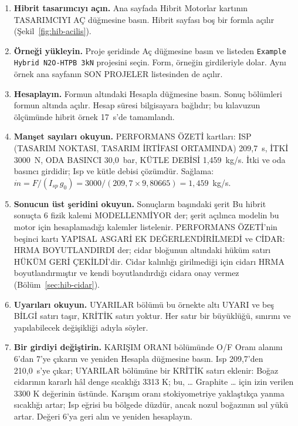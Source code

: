 \documentclass[11pt,a4paper]{article}
\newcommand{\ui}[1]{\textsf{#1}}
\newcommand{\kod}[1]{\texttt{#1}}
\begin{document}
\begin{enumerate}[leftmargin=1.6em]
  \item \textbf{Hibrit tasarımcıyı açın.} Ana sayfada \ui{Hibrit Motorlar}
  kartının \ui{TASARIMCIYI AÇ} düğmesine basın. Hibrit sayfası boş bir formla
  açılır (Şekil~\ref{fig:hib-acilis}).

  \item \textbf{Örneği yükleyin.} Proje şeridinde \ui{Aç} düğmesine basın ve
  listeden \kod{Example Hybrid N2O-HTPB 3kN} projesini seçin. Form, örneğin
  girdileriyle dolar. Aynı örnek ana sayfanın \ui{SON PROJELER} listesinden de
  açılır.

  \item \textbf{Hesaplayın.} Formun altındaki \ui{Hesapla} düğmesine basın.
  Sonuç bölümleri formun altında açılır. Hesap süresi bilgisayara bağlıdır;
  bu kılavuzun ölçümünde hibrit örnek 17~s'de tamamlandı.

  \item \textbf{Manşet sayıları okuyun.} \ui{PERFORMANS ÖZETİ} kartları:
  \ui{ISP (TASARIM NOKTASI, TASARIM İRTİFASI ORTAMINDA)} 209,7~s,
  \ui{İTKİ} 3000~N, \ui{ODA BASINCI} 30,0~bar, \ui{KÜTLE DEBİSİ}
  1,459~kg/s. İtki ve oda basıncı girdidir; Isp ve kütle debisi çözümdür.
  Sağlama: $\dot m = F/(I_{sp}\,g_0) = 3000/(209{,}7 \times 9{,}80665) =
  1{,}459$~kg/s.

  \item \textbf{Sonucun üst şeridini okuyun.} Sonuçların başındaki şerit
  \ui{Bu hibrit sonuçta 6 fizik kalemi MODELLENMİYOR} der; şerit açılınca
  modelin bu motor için hesaplamadığı kalemler listelenir. \ui{PERFORMANS
  ÖZETİ}'nin beşinci kartı \ui{YAPISAL ASGARİ EK} \ui{DEĞERLENDİRİLMEDİ} ve
  \ui{CİDAR: HRMA BOYUTLANDIRDI} der; cidar bloğunun altındaki hüküm satırı
  \ui{HÜKÜM GERİ ÇEKİLDİ}'dir. Cidar kalınlığı girilmediği için cidarı HRMA
  boyutlandırmıştır ve kendi boyutlandırdığı cidara onay vermez
  (Bölüm~\ref{sec:hib-cidar}).

  \item \textbf{Uyarıları okuyun.} \ui{UYARILAR} bölümü bu örnekte altı
  \ui{UYARI} ve beş \ui{BİLGİ} satırı taşır, \ui{KRİTİK} satırı yoktur. Her
  satır bir büyüklüğü, sınırını ve yapılabilecek değişikliği adıyla söyler.

  \item \textbf{Bir girdiyi değiştirin.} \ui{KARIŞIM ORANI} bölümünde
  \ui{O/F Oranı} alanını 6'dan 7'ye çıkarın ve yeniden \ui{Hesapla} düğmesine
  basın. Isp 209,7'den 210,0~s'ye çıkar; \ui{UYARILAR} bölümüne bir
  \ui{KRİTİK} satırı eklenir: \ui{Boğaz cidarının kararlı hâl denge sıcaklığı
  3313 K; bu, \ldots{} Graphite \ldots{} için izin verilen 3300 K değerinin
  üstünde.}
  Karışım oranı stokiyometriye yaklaştıkça yanma sıcaklığı artar; Isp eğrisi
  bu bölgede düzdür, ancak nozul boğazının ısıl yükü artar. Değeri 6'ya geri
  alın ve yeniden hesaplayın.


\end{enumerate}
\end{document}
